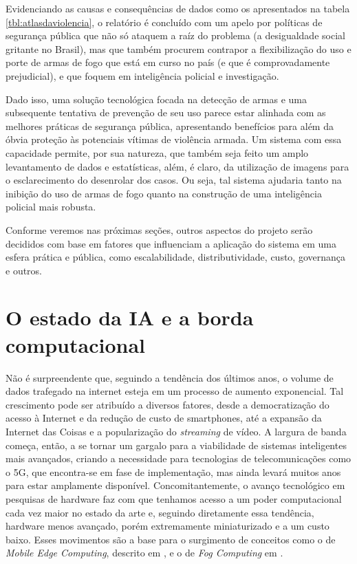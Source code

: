 \documentclass[]{politex}
\begin{document}
Evidenciando as causas e consequências de dados como os apresentados na tabela \ref{tbl:atlasdaviolencia}, o relatório é concluído com um apelo por políticas de segurança pública que não só ataquem a raíz do problema (a desigualdade social gritante no Brasil), mas que também procurem contrapor a flexibilização do uso e porte de armas de fogo que está em curso no país (e que é comprovadamente prejudicial), e que foquem em inteligência policial e investigação.

Dado isso, uma solução tecnológica focada na detecção de armas e uma subsequente tentativa de prevenção de seu uso parece estar alinhada com as melhores práticas de segurança pública, apresentando benefícios para além da óbvia proteção às potenciais vítimas de violência armada. Um sistema com essa capacidade permite, por sua natureza, que também seja feito um amplo levantamento de dados e estatísticas, além, é claro, da utilização de imagens para o esclarecimento do desenrolar dos casos. Ou seja, tal sistema ajudaria tanto na inibição do uso de armas de fogo quanto na construção de uma inteligência policial mais robusta.

Conforme veremos nas próximas seções, outros aspectos do projeto serão decididos com base em fatores que influenciam a aplicação do sistema em uma esfera prática e pública, como escalabilidade, distributividade, custo, governança e outros.

\section{O estado da IA e a borda computacional}

Não é surpreendente que, seguindo a tendência dos últimos anos, o volume de dados trafegado na internet esteja em um processo de aumento exponencial. Tal crescimento pode ser atribuído a diversos fatores, desde a democratização do acesso à Internet e da redução de custo de smartphones, até a expansão da Internet das Coisas e a popularização do \textit{streaming} de vídeo. A largura de banda começa, então, a se tornar um gargalo para a viabilidade de sistemas inteligentes mais avançados, criando a necessidade para tecnologias de telecomunicações como o 5G, que encontra-se em fase de implementação, mas ainda levará muitos anos para estar amplamente disponível. Concomitantemente, o avanço tecnológico em pesquisas de hardware faz com que tenhamos acesso a um poder computacional cada vez maior no estado da arte e, seguindo diretamente essa tendência, hardware menos avançado, porém extremamente miniaturizado e a um custo baixo. Esses movimentos são a base para o surgimento de conceitos como o de \textit{Mobile Edge Computing}, descrito em \citeyear{mectaxonomy} \citeauthor{mectaxonomy}, e o de \textit{Fog Computing} em \citeyear{fogcomputing} \citeauthor{fogcomputing}.
\end{document}
